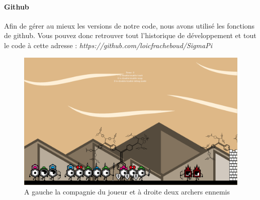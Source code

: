 \documentclass[a4paper,10pt]{article}
\begin{document}
  \paragraph{Github}
  Afin de gérer au mieux les versions de notre code, nous avons utilisé les fonctions de github. Vous pouvez donc retrouver tout l'historique de développement et tout le code à cette adresse : {\itshape https://github.com/loicfracheboud/SigmaPi}
  \begin{figure}[!h]
 \centering
 \vspace{5pt}
 \includegraphics[scale=0.25]{images/menu}
 \caption{A gauche la compagnie du joueur et à droite deux archers ennemis}
 \end{figure}  
  \pagebreak
  
\end{document}
